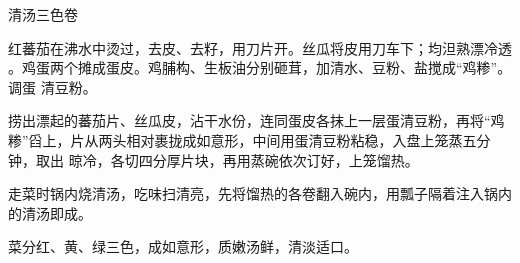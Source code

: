 \begin{recipe}[三色如意卷]{清汤三色卷}

\ingredients


\preparation

\step 红蕃茄在沸水中烫过，去皮、去籽，用刀片开。丝瓜将皮用刀车下；均泹熟漂冷透
。鸡蛋两个摊成蛋皮。鸡脯构、生板油分别砸茸，加清水、豆粉、盐搅成“鸡糁”。调蛋
清豆粉。

\step 捞出漂起的蕃茄片、丝瓜皮，沾干水份，连同蛋皮各抹上一层蛋清豆粉，再将“鸡
糁”舀上，片从两头相对裹拢成如意形，中间用蛋清豆粉粘稳，入盘上笼蒸五分钟，取出
晾冷，各切四分厚片块，再用蒸碗依次订好，上笼馏热。

\step 走菜时锅内烧清汤，吃味扫清亮，先将馏热的各卷翻入碗内，用瓢子隔着注入锅内
的清汤即成。

\features

菜分红、黄、绿三色，成如意形，质嫩汤鲜，清淡适口。

\end{recipe}

